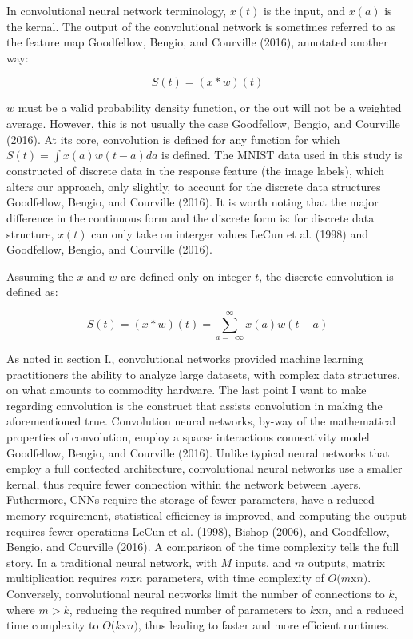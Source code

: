 \documentclass[conference,final,]{IEEEtran}
\begin{document}
In convolutional neural network terminology, \(x(t)\) is the input, and
\(x(a)\) is the kernal. The output of the convolutional network is
sometimes referred to as the feature map Goodfellow, Bengio, and
Courville (2016), annotated another way:

\begin{equation}
    S(t) =  (x*w)(t)
\end{equation}

\(w\) must be a valid probability density function, or the out will not
be a weighted average. However, this is not usually the case Goodfellow,
Bengio, and Courville (2016). At its core, convolution is defined for
any function for which \(S(t)=\int x(a)w(t-a)da\) is defined. The MNIST
data used in this study is constructed of discrete data in the response
feature (the image labels), which alters our approach, only slightly, to
account for the discrete data structures Goodfellow, Bengio, and
Courville (2016). It is worth noting that the major difference in the
continuous form and the discrete form is: for discrete data structure,
\(x(t)\) can only take on interger values LeCun et al. (1998) and
Goodfellow, Bengio, and Courville (2016).

Assuming the \(x\) and \(w\) are defined only on integer \(t\), the
discrete convolution is defined as:

\begin{equation}
    S(t) = (x*w)(t)=\sum\limits_{a=\neg\infty}^\infty{x(a)w(t-a)}
\end{equation}

As noted in section I., convolutional networks provided machine learning
practitioners the ability to analyze large datasets, with complex data
structures, on what amounts to commodity hardware. The last point I want
to make regarding convolution is the construct that assists convolution
in making the aforementioned true. Convolution neural networks, by-way
of the mathematical properties of convolution, employ a sparse
interactions connectivity model Goodfellow, Bengio, and Courville
(2016). Unlike typical neural networks that employ a full contected
architecture, convolutional neural networks use a smaller kernal, thus
require fewer connection within the network between layers. Futhermore,
CNNs require the storage of fewer parameters, have a reduced memory
requirement, statistical efficiency is improved, and computing the
output requires fewer operations LeCun et al. (1998), Bishop (2006), and
Goodfellow, Bengio, and Courville (2016). A comparison of the time
complexity tells the full story. In a traditional neural network, with
\(M\) inputs, and \(m\) outputs, matrix multiplication requires
\(m\)x\(n\) parameters, with time complexity of \(O(m\)x\(n)\).
Conversely, convolutional neural networks limit the number of
connections to \(k\), where \(m > k\), reducing the required number of
parameters to \(k\)x\(n\), and a reduced time complexity to
\(O(k\)x\(n)\), thus leading to faster and more efficient runtimes.
\end{document}
